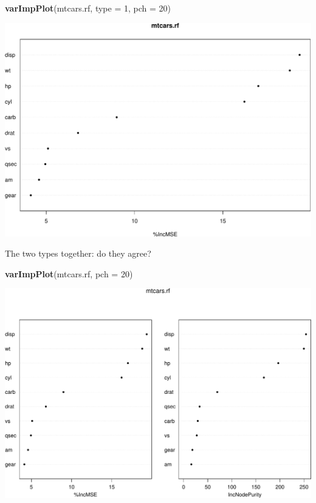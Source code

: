 \documentclass[ignorenonframetext,]{beamer}
\newenvironment{Shaded}{\begin{snugshade}}{\end{snugshade}}
\newcommand{\KeywordTok}[1]{\textcolor[rgb]{0.13,0.29,0.53}{\textbf{#1}}}
\newcommand{\DataTypeTok}[1]{\textcolor[rgb]{0.13,0.29,0.53}{#1}}
\newcommand{\DecValTok}[1]{\textcolor[rgb]{0.00,0.00,0.81}{#1}}
\newcommand{\NormalTok}[1]{#1}
\begin{document}
\begin{frame}[fragile]

\begin{Shaded}
\begin{Highlighting}[]
\KeywordTok{varImpPlot}\NormalTok{(mtcars.rf, }\DataTypeTok{type =} \DecValTok{1}\NormalTok{, }\DataTypeTok{pch =} \DecValTok{20}\NormalTok{)}
\end{Highlighting}
\end{Shaded}

\includegraphics{8TreesBEAMER_files/figure-beamer/unnamed-chunk-30-1.pdf}

\end{frame}

\begin{frame}[fragile]

The two types together: do they agree?

\begin{Shaded}
\begin{Highlighting}[]
\KeywordTok{varImpPlot}\NormalTok{(mtcars.rf, }\DataTypeTok{pch =} \DecValTok{20}\NormalTok{)}
\end{Highlighting}
\end{Shaded}

\includegraphics{8TreesBEAMER_files/figure-beamer/unnamed-chunk-31-1.pdf}

\end{frame}
\end{document}
